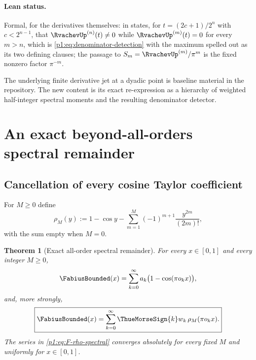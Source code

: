 \documentclass[11pt,oneside]{article}
\newtheorem{theorem}{Theorem}[section]
\theoremstyle{definition}
\theoremstyle{remark}
\begin{document}
\paragraph{Lean status.}
Formal, for the derivatives themselves:
 in
 states, for \(t=(2c+1)/2^n\) with \(c<2^{n-1}\), that
\(\RvachevUp^{(n)}(t)\ne0\) while \(\RvachevUp^{(m)}(t)=0\) for every \(m>n\), which is
\eqref{p1:eq:denominator-detection} with the maximum spelled out as its two defining
clauses; the passage to \(S_m=\RvachevUp^{(m)}/\pi^m\) is the fixed nonzero factor
\(\pi^{-m}\).

\begin{remark}
The underlying finite derivative jet at a dyadic point is baseline material in
the repository.  The new content is its exact re-expression as a hierarchy of
weighted half-integer spectral moments and the resulting denominator detector.
\end{remark}

\section{An exact beyond-all-orders spectral remainder}\label{p1:sec:beyond-all-orders}

\subsection{Cancellation of every cosine Taylor coefficient}

For $M\ge0$ define
\begin{equation}\label{p1:eq:rho-M}
 \rho_M(y):=1-\cos y-
 \sum_{m=1}^{M}(-1)^{m+1}\frac{y^{2m}}{(2m)!},
\end{equation}
with the sum empty when $M=0$.

\begin{theorem}[Exact all-order spectral remainder]\label{p1:thm:spectral-remainder}
For every $x\in[0,1]$ and every integer $M\ge0$,
\begin{equation}\label{p1:eq:F-basic-spectral}
 \FabiusBounded(x)=\sum_{k=0}^{\infty}a_k
 \bigl(1-\cos(\pi o_kx)\bigr),
\end{equation}
and, more strongly,
\begin{equation}\label{p1:eq:F-rho-spectral}
 \boxed{
 \FabiusBounded(x)=\sum_{k=0}^{\infty}\ThueMorseSign{k}w_k\,
 \rho_M(\pi o_kx).}
\end{equation}
The series in \eqref{p1:eq:F-rho-spectral} converges absolutely for every fixed
$M$ and uniformly for $x\in[0,1]$.
\end{theorem}
\end{document}
